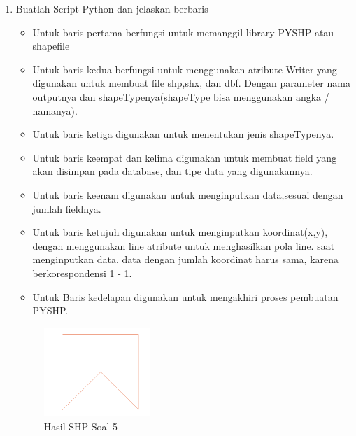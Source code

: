 \begin{enumerate}
	\item Buatlah Script Python dan jelaskan berbaris
	
	\begin{itemize}
		\item Untuk baris pertama berfungsi untuk memanggil library PYSHP atau shapefile
		\item Untuk baris kedua berfungsi untuk menggunakan atribute Writer yang digunakan untuk membuat file shp,shx, dan dbf. \hfill\break Dengan parameter nama outputnya dan shapeTypenya(shapeType bisa menggunakan angka / namanya).
		\item Untuk baris ketiga digunakan untuk menentukan jenis shapeTypenya.
		\item Untuk baris keempat dan kelima digunakan untuk membuat field yang akan disimpan pada database, dan tipe data yang digunakannya.
		\item Untuk baris keenam digunakan untuk menginputkan data,sesuai dengan jumlah fieldnya.
		\item Untuk baris ketujuh digunakan untuk menginputkan koordinat(x,y), dengan menggunakan line atribute untuk menghasilkan pola line. \hfill\break
		saat menginputkan data, data dengan jumlah koordinat harus sama, karena berkorespondensi 1 - 1.
		\item Untuk Baris kedelapan digunakan untuk mengakhiri proses pembuatan PYSHP.
	\end{itemize}
	\hfill\break
	\begin{figure}[H]
		\includegraphics[width=4cm]{figures/1174004/2/5.png}
		\centering
		\caption{Hasil SHP Soal 5}
	\end{figure}


\end{enumerate}
